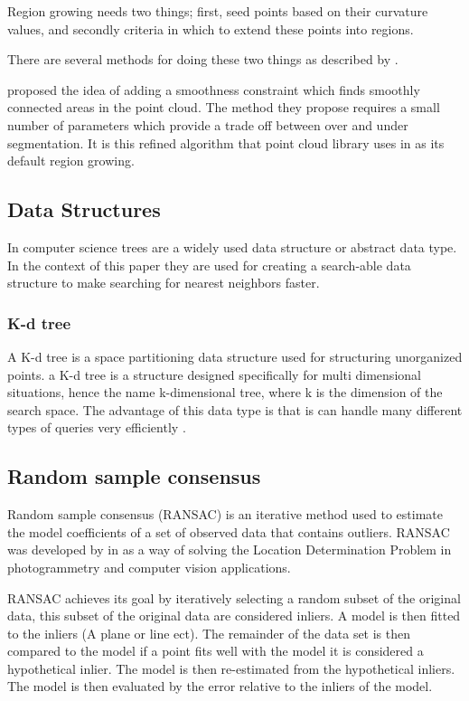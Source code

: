 			Region growing needs two things; first, seed points based on their curvature values, and secondly criteria in which to extend these points into regions.
			
			There are several methods for doing these two things as described by \cite{hoover_experimental_1996}.		
			
			\cite{rabbani_segmentation_2006} proposed the idea of adding a smoothness constraint which finds smoothly connected areas in the point cloud. The method they propose requires a small number of parameters which provide a trade off between over and under segmentation. It is this refined algorithm that point cloud library uses in as its default region growing.
			
			
	\subsection{Data Structures}
		In computer science trees are a widely used data structure or abstract data type. In the context of this paper they are used for creating a search-able data structure to make searching for nearest neighbors faster.
		
		\subsubsection{K-d tree}
			A K-d tree is a space partitioning data structure used for structuring unorganized points. a K-d tree is a structure designed specifically for multi dimensional situations, hence the name k-dimensional tree, where k is the dimension of the search space. The advantage of this data type is that is can handle many different types of queries very efficiently \citep{bentley_multidimensional_1975}.
			
			
			
	\subsection{Random sample consensus}
		Random sample consensus (RANSAC) is an iterative method used to estimate the model coefficients of a set of observed data that contains outliers. RANSAC was developed by \citeauthor{fischler_random_1981} in \citeyear{fischler_random_1981} as a way of solving the Location Determination Problem in photogrammetry and computer vision applications.
		
		RANSAC achieves its goal by iteratively selecting a random subset of the original data, this subset of the original data are considered inliers. A model is then fitted to the inliers (A plane or line ect). The remainder of the data set is then compared to the model if a point fits well with the model it is considered a hypothetical inlier. The model is then re-estimated from the hypothetical inliers. The model is then evaluated by the error relative to the inliers of the model.
		
